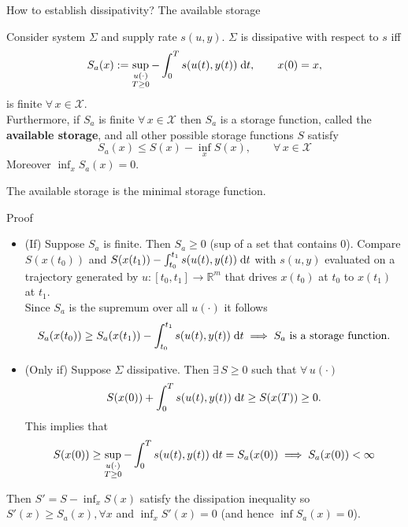 \documentclass[aspectratio=169]{beamer}
\newcommand{\bbR}{\mathbb{R}}
\begin{document}
\begin{frame}{How to establish dissipativity? The available storage}
	
\begin{theorem}
Consider system $\Sigma$ and supply rate $s(u, y)$. $\Sigma$ is dissipative with respect to $s$ iff
\begin{equation}\label{eq:Sa}
	S_a(x):= \sup_{\substack{u(\cdot) \\ T \ge 0}} - \int_0^T s(u(t), y(t)) \d t, \qquad x(0) = x,
\end{equation}
is finite $\forall \, x \in \mathcal{X}$. \\
Furthermore, if $S_a$ is finite $\forall \, x \in \mathcal{X}$ then $S_a$ is a storage function, called the \textbf{available storage}, and all other possible storage functions $S$ satisfy
\begin{equation*}
	S_a(x) \le S(x) - \inf_x S(x), \qquad \forall \,  x \in \mathcal{X}
\end{equation*}
Moreover $\inf_x S_a(x)=0.$
\end{theorem}

The available storage is the minimal storage function.
	
\end{frame}

\begin{frame}{Proof}

		\begin{itemize}
			\item (If) Suppose $S_a$ is finite. Then $S_a \ge 0$ (sup of a set that contains 0).  Compare $S(x(t_0))$ and $S(x(t_1)) - \int_{t_0}^{t_1} s(u(t), y(t))\d t$ with $s(u, y)$ evaluated on a trajectory generated by $u: [t_0, t_1] \rightarrow \bbR^m$ that drives $x(t_0)$ at $t_0$ to $x(t_1)$ at $t_1$. \\
			Since $S_a$ is the supremum over all $u(\cdot)$ it follows
			\begin{equation*}
				S_a(x(t_0)) \ge S_a(x(t_1)) - \int_{t_0}^{t_1} s(u(t), y(t)) \d t \implies S_a \text{ is a storage function.}
			\end{equation*}
			\item (Only if) Suppose $\Sigma$ dissipative. Then $\exists\,  S \ge 0$ such that $\forall \, u(\cdot)$
			\begin{equation*}
				S(x(0)) + \int_0^T s(u(t), y(t)) \d t \ge S(x(T)) \ge 0.
			\end{equation*}
		This implies that $$S(x(0)) \ge \sup_{\substack{u(\cdot) \\ T \ge 0}} - \int_0^T s(u(t), y(t)) \d t = S_a(x(0)) \implies S_a(x(0)) < \infty$$
		\end{itemize}
		Then $S'= S - \inf_x S(x)$ satisfy the dissipation inequality so $S'(x) \ge S_a(x), \forall x$ and $\inf_x S'(x)=0$ (and hence $\inf S_a(x)=0$).
\end{frame}
\end{document}
